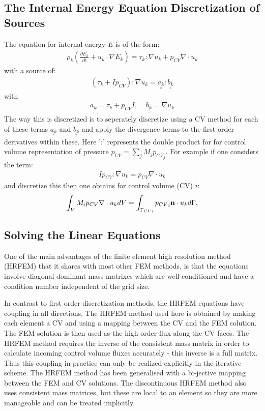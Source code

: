 \subsection{The Internal Energy Equation Discretization of Sources} 
\label{thermal-sources}
The equation for internal energy $E$ is of the form: 
\begin{eqnarray}
\rho_k (\frac{\partial E_k}{\partial t} + u_k\cdot\nabla E_k )
= \tau_k :  \nabla u_k + p_{CV} \nabla \cdot u_k
\end{eqnarray}
with a source of:
\begin{eqnarray}
(\tau_k + Ip_{CV}) :  \nabla u_k = \underline{\underline {a_k}} :  \underline{\underline {b_k}}
\end{eqnarray}
with
\begin{eqnarray}
\underline{\underline {a_k}}=\tau_k + p_{CV} I,  \;\;\;\;
\underline{\underline {b_k}}=\nabla u_k
\end{eqnarray}
The way this is discretized is to seperately discretize using a CV method 
for each of these terms $\underline{\underline {a_k}}$ and $\underline{\underline {b_k}}$ and apply the divergence terms to the first order 
derivatives within these. Here ':' represents the double product for for control volume 
representation of pressure $p_{CV} = \sum_j M_j {p_{CV}}_j$.  
For example if one considers the term:
\begin{eqnarray}
Ip_{CV} :  \nabla u_k = p_{CV}\nabla \cdot u_k
\end{eqnarray}
and discretize this then one obtains for control volume (CV) $i$:
\begin{eqnarray}
 \int_V M_i p_{CV}\nabla \cdot u_k dV = \int_{\Gamma_{CVi}} {p_{CV}}_i {\bf n}\cdot u_k d\Gamma. 
\end{eqnarray}




\subsection{Solving the Linear Equations}

One of the main advantages of the finite element high resolution method (HRFEM) that it shares with most other FEM methods, is that the equations involve diagonal dominant mass matrixes which are well conditioned and have a condition number independent of the grid size.

In contrast to first order discretization methods, the HRFEM equations have coupling in all directions. The HRFEM method used here is obtained by making each element a CV and using a mapping between the CV and the FEM solution. The FEM solution is then used as the high order flux along the CV faces. The HRFEM method requires the inverse of the consistent mass matrix in order to calculate incoming control volume fluxes accurately - this inverse is a full matrix. Thus this coupling in practice can only be realized explicitly in the iterative scheme.  The HRFEM method has been generalised with a bi-jective mapping between the FEM and CV solutions. The discontinuous HRFEM method also uses consistent mass matrices, but these are local to an element so they are more manageable and can be treated implicitly.

